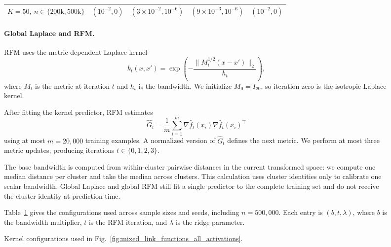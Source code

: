 \documentclass{article}
\begin{document}
\begin{figure}
\begin{table}[t]
{\begin{tabular}{@{}lcccc@{}}
\(K=50,\ n\in\{200\mathrm{k},500\mathrm{k}\}\)
& \((10^{-2},0)\)
& \((3{\times}10^{-2},10^{-6})\)
& \((9{\times}10^{-3},10^{-6})\)
& \((10^{-2},0)\)
\\
\bottomrule
\end{tabular}%
}
\end{table}


\paragraph{Global Laplace and RFM.}
RFM uses the metric-dependent Laplace kernel
\begin{equation}
    k_t(x,x')
    =
    \exp\!\left(
        -\frac{\|M_t^{1/2}(x-x')\|_2}{h_t}
    \right),
    \label{eq:local-routing-rfm-kernel}
\end{equation}
where \(M_t\) is the metric at iteration \(t\) and \(h_t\) is the bandwidth.
We initialize \(M_0=I_{20}\), so iteration zero is the isotropic Laplace
kernel.

After fitting the kernel predictor, RFM estimates
\[
    \widehat G_t
    =
    \frac{1}{m}
    \sum_{i=1}^{m}
    \nabla\widehat f_t(x_i)
    \nabla\widehat f_t(x_i)^\top
\]
using at most \(m=20{,}000\) training examples. A normalized version of
\(\widehat G_t\) defines the next metric. We perform at most three metric
updates, producing iterations \(t\in\{0,1,2,3\}\).

The base bandwidth is computed from within-cluster pairwise distances in the
current transformed space: we compute one median distance per cluster and
take the median across clusters. This calculation uses cluster identities
only to calibrate one scalar bandwidth. Global Laplace and global RFM still
fit a single predictor to the complete training set and do not receive the
cluster identity at prediction time.

Table~\ref{tab:kernel-hparams} gives the configurations used across
sample sizes and seeds, including \(n=500{,}000\). Each entry is
\((b,t,\lambda)\), where \(b\) is the bandwidth multiplier, \(t\) is the RFM
iteration, and \(\lambda\) is the ridge parameter.

\begin{table}[t]
\centering
\small
\caption{Kernel configurations used in
Fig.~\ref{fig:mixed_link_functions_all_activations}.}
\label{tab:kernel-hparams}
\end{table}
\end{figure}
\end{document}
